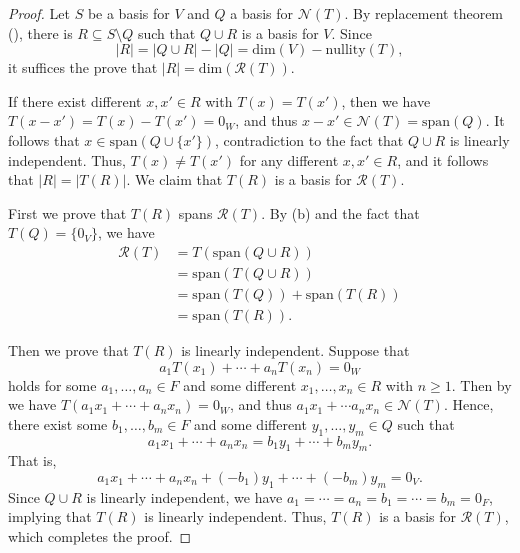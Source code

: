 \begin{proof}
  Let $S$ be a basis for $V$ and $Q$ a basis for $\mathcal{N}(T)$.
  By replacement theorem (), there is
  $R \subseteq S \setminus Q$ such that $Q \cup R$ is a basis for $V$.
  Since
  \begin{equation*}
    |R| = |Q \cup R| - |Q| = \mathrm{dim}(V) - \mathrm{nullity}(T),
  \end{equation*}
  it suffices the prove that $|R| = \mathrm{dim}(\mathcal{R}(T))$.
  
  If there exist different $x, x' \in R$ with $T(x) = T(x')$, then we have
  $T(x - x') = T(x) - T(x') = 0_W$, and thus
  $x - x' \in \mathcal{N}(T) = \mathrm{span}(Q)$.
  It follows that $x \in \mathrm{span}(Q \cup \{x'\})$,
  contradiction to the fact that $Q \cup R$ is linearly independent.
  Thus, $T(x) \neq T(x')$ for any different $x, x' \in R$, and it follows that
  $|R| = |T(R)|$.
  We claim that $T(R)$ is a basis for $\mathcal{R}(T)$.

  First we prove that $T(R)$ spans $\mathcal{R}(T)$.
  By  (b) and the fact that $T(Q) = \{0_V\}$, we have
  \begin{align*}
    \mathcal{R}(T) &= T(\mathrm{span}(Q \cup R)) \\
                   &= \mathrm{span}(T(Q \cup R)) \\
                   &= \mathrm{span}(T(Q)) + \mathrm{span}(T(R)) \\
                   &= \mathrm{span}(T(R)).
  \end{align*}

  Then we prove that $T(R)$ is linearly independent.
  Suppose that
  \begin{equation*}
    a_1T(x_1) + \cdots + a_nT(x_n) = 0_W
  \end{equation*}
  holds for some $a_1, \dots, a_n \in F$ and some different
  $x_1, \dots, x_n \in R$ with $n \geq 1$.
  Then by  we have $T(a_1x_1 + \cdots + a_nx_n) = 0_W$,
  and thus $a_1x_1 + \cdots a_nx_n \in \mathcal{N}(T)$.
  Hence, there exist some $b_1, \dots, b_m \in F$ and some different
  $y_1, \dots, y_m \in Q$ such that
  \begin{equation*}
    a_1x_1 + \cdots + a_nx_n = b_1y_1 + \cdots + b_my_m.
  \end{equation*}
  That is,
  \begin{equation*}
    a_1x_1 + \cdots + a_nx_n + (-b_1)y_1 + \cdots + (-b_m)y_m = 0_V.
  \end{equation*}
  Since $Q \cup R$ is linearly independent, we have
  $a_1 = \cdots = a_n = b_1 = \cdots = b_m = 0_F$, implying that $T(R)$ is
  linearly independent.
  Thus, $T(R)$ is a basis for $\mathcal{R}(T)$, which completes the proof.
\end{proof}

